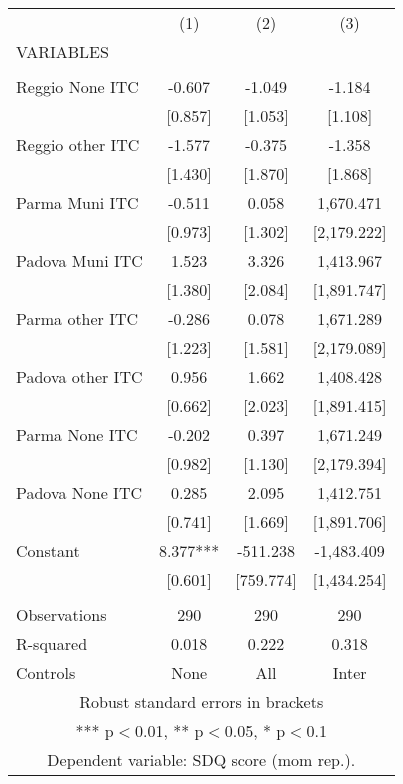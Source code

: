 \begin{tabular}{lccc} \hline
 & (1) & (2) & (3) \\
VARIABLES &  &  &  \\ \hline
 &  &  &  \\
Reggio None ITC & -0.607 & -1.049 & -1.184 \\
 & [0.857] & [1.053] & [1.108] \\
Reggio other ITC & -1.577 & -0.375 & -1.358 \\
 & [1.430] & [1.870] & [1.868] \\
Parma Muni ITC & -0.511 & 0.058 & 1,670.471 \\
 & [0.973] & [1.302] & [2,179.222] \\
Padova Muni ITC & 1.523 & 3.326 & 1,413.967 \\
 & [1.380] & [2.084] & [1,891.747] \\
Parma other ITC & -0.286 & 0.078 & 1,671.289 \\
 & [1.223] & [1.581] & [2,179.089] \\
Padova other ITC & 0.956 & 1.662 & 1,408.428 \\
 & [0.662] & [2.023] & [1,891.415] \\
Parma None ITC & -0.202 & 0.397 & 1,671.249 \\
 & [0.982] & [1.130] & [2,179.394] \\
Padova None ITC & 0.285 & 2.095 & 1,412.751 \\
 & [0.741] & [1.669] & [1,891.706] \\
Constant & 8.377*** & -511.238 & -1,483.409 \\
 & [0.601] & [759.774] & [1,434.254] \\
 &  &  &  \\
Observations & 290 & 290 & 290 \\
R-squared & 0.018 & 0.222 & 0.318 \\
 Controls & None & All & Inter \\ \hline
\multicolumn{4}{c}{ Robust standard errors in brackets} \\
\multicolumn{4}{c}{ *** p$<$0.01, ** p$<$0.05, * p$<$0.1} \\
\multicolumn{4}{c}{ Dependent variable: SDQ score (mom rep.).} \\
\end{tabular}
